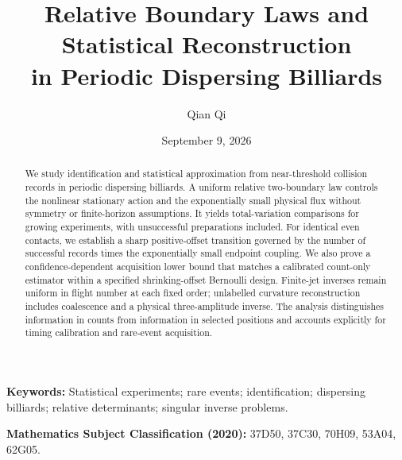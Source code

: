 
\title{Relative Boundary Laws and Statistical Reconstruction\\ in Periodic Dispersing Billiards}
\author{Qian Qi}
\date{September 9, 2026}

\maketitle
\begin{abstract}
We study identification and statistical approximation from near-threshold collision records in periodic dispersing billiards. A uniform relative two-boundary law controls the nonlinear stationary action and the exponentially small physical flux without symmetry or finite-horizon assumptions. It yields total-variation comparisons for growing experiments, with unsuccessful preparations included. For identical even contacts, we establish a sharp positive-offset transition governed by the number of successful records times the exponentially small endpoint coupling. We also prove a confidence-dependent acquisition lower bound that matches a calibrated count-only estimator within a specified shrinking-offset Bernoulli design. Finite-jet inverses remain uniform in flight number at each fixed order; unlabelled curvature reconstruction includes coalescence and a physical three-amplitude inverse. The analysis distinguishes information in counts from information in selected positions and accounts explicitly for timing calibration and rare-event acquisition.
\end{abstract}
\noindent\textbf{Keywords:} Statistical experiments; rare events; identification; dispersing billiards; relative determinants; singular inverse problems.\par
\noindent\textbf{Mathematics Subject Classification (2020):} 37D50, 37C30, 70H09, 53A04, 62G05.
























\appendix









